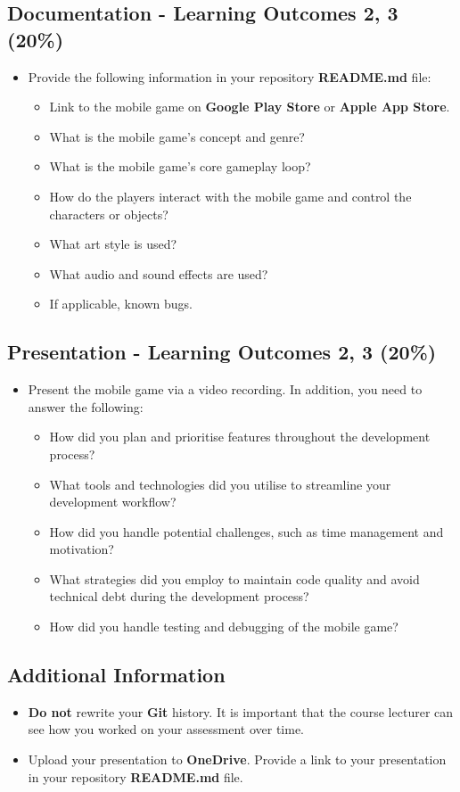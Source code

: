 \documentclass{article}
\begin{document}
\subsection*{Documentation - Learning Outcomes 2, 3 (20\%)}
\begin{itemize}
	\item Provide the following information in your repository \textbf{README.md} file:
	\begin{itemize}
		\item Link to the mobile game on \textbf{Google Play Store} or \textbf{Apple App Store}.
		\item What is the mobile game's concept and genre?
		\item What is the mobile game's core gameplay loop?
		\item How do the players interact with the mobile game and control the characters or objects?
		\item What art style is used?
		\item What audio and sound effects are used?
		\item If applicable, known bugs.
	\end{itemize}
\end{itemize}

\subsection*{Presentation - Learning Outcomes 2, 3 (20\%)}
\begin{itemize}
	\item Present the mobile game via a video recording. In addition, you need to answer the following:
	\begin{itemize}
		\item How did you plan and prioritise features throughout the development process?
		\item What tools and technologies did you utilise to streamline your development workflow?
		\item How did you handle potential challenges, such as time management and motivation?
		\item What strategies did you employ to maintain code quality and avoid technical debt during the development process?
		\item How did you handle testing and debugging of the mobile game?
	\end{itemize}
\end{itemize}

\subsection*{Additional Information}
\begin{itemize}
	\item \textbf{Do not} rewrite your \textbf{Git} history. It is important that the course lecturer can see how you worked on your assessment over time.
	\item Upload your presentation to \textbf{OneDrive}. Provide a link to your presentation in your repository \textbf{README.md} file.
\end{itemize}
\end{document}
